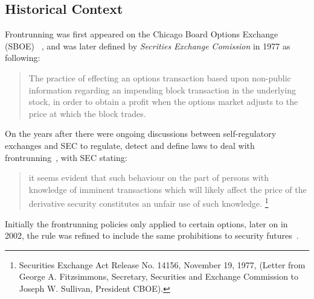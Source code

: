 






\subsection{Historical Context}
Frontrunning was first appeared on the Chicago Board Options Exchange (SBOE) ~\cite{markham1988front}, and was later defined by \textit{Secrities Exchange Comission} in 1977 as following:
\begin{quote}
The practice of effecting an options transaction based upon non-public information regarding an impending block transaction in the underlying stock, in order to obtain a profit when the options market adjusts to the price at which the block trades. ~\cite{sec1978cboe}
\end{quote} 
On the years after there were ongoing discussions between self-regulatory exchanges and SEC to regulate, detect and define laws to deal with frontrunning~\cite{markham1988front}, with SEC stating: 
\begin{quote}
it seems evident that such behaviour on the part of persons with knowledge of imminent transactions which will likely affect the price of the derivative security constitutes an unfair use of such knowledge. \footnote{Securities Exchange Act Release No. 14156, November 19, 1977, (Letter from George A. Fitzsimmons, Secretary, Securities and Exchange Commission to Joseph W. Sullivan, President  CBOE).}
\end{quote} 
Initially the frontrunning policies only applied to certain options, later on in 2002, the rule was refined to include the same prohibitions to security futures~\cite{sec2012frontrunning}.





